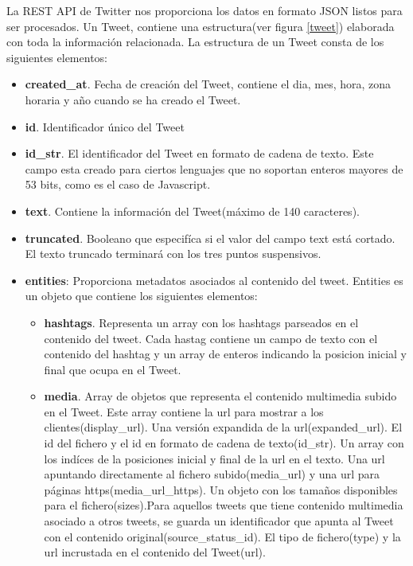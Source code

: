La REST API de Twitter nos proporciona los datos en formato JSON listos para ser procesados. Un Tweet, contiene una estructura(ver figura \ref{tweet}) elaborada con toda la información relacionada. La estructura de un Tweet consta de los siguientes elementos:

\begin{itemize}

\item \textbf{created\_at}. Fecha de creación del Tweet, contiene el dia, mes, hora, zona horaria y año cuando se ha creado el Tweet.
\item \textbf{id}. Identificador único del Tweet
\item \textbf{id\_str}. El identificador del Tweet en formato de cadena de texto. Este campo esta creado para ciertos lenguajes que no soportan enteros mayores de 53 bits, como es el caso de Javascript.
\item \textbf{text}. Contiene la información del Tweet(máximo de 140 caracteres).
\item \textbf{truncated}. Booleano que especifíca si el valor del campo text está cortado. El texto truncado terminará con los tres puntos suspensivos.
\item \textbf{entities}: Proporciona metadatos asociados al contenido del tweet. Entities es un objeto que contiene los siguientes elementos:

\begin{itemize}

\item \textbf{hashtags}. Representa un array con los hashtags parseados en el contenido del tweet. Cada hastag contiene un campo de texto con el contenido del hashtag y un array de enteros indicando la posicion inicial y final que ocupa en el Tweet.

\item \textbf{media}. Array de objetos que representa el contenido multimedia subido en el Tweet. Este array contiene la url para mostrar a los clientes(display\_url). Una versión expandida de la url(expanded\_url). El id del fichero y el id en formato de cadena de texto(id\_str). Un array con los indíces de la posiciones inicial y final de la url en el texto. Una url apuntando directamente al fichero subido(media\_url) y una url para páginas https(media\_url\_https). Un objeto con los tamaños disponibles para el fichero(sizes).Para aquellos tweets que tiene contenido multimedia asociado a otros tweets, se guarda un identificador que apunta al Tweet con el contenido original(source\_status\_id). El tipo de fichero(type) y la url incrustada en el contenido del Tweet(url).


\end{itemize}
\end{itemize}
